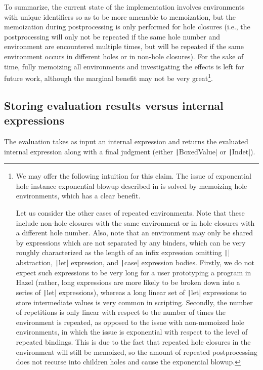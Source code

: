 To summarize, the current state of the implementation involves environments with unique identifiers so as to be more amenable to memoization, but the memoization during postprocessing is only performed for hole closures (i.e., the postprocessing will only not be repeated if the same hole number and environment are encountered multiple times, but will be repeated if the same environment occurs in different holes or in non-hole closures). For the sake of time, fully memoizing all environments and investigating the effects is left for future work, although the marginal benefit may not be very great\footnote{
  We may offer the following intuition for this claim. The issue of exponential hole instance exponential blowup described in  is solved by memoizing hole environments, which has a clear benefit.

  Let us consider the other cases of repeated environments. Note that these include non-hole closures with the same environment or in hole closures with a different hole number. Also, note that an environment may only be shared by expressions which are not separated by any binders, which can be very roughly characterized as the length of an infix expression omitting \texttt|\lambda| abstraction, \texttt|let| expression, and \texttt|case| expression bodies. Firstly, we do not expect such expressions to be very long for a user prototyping a program in Hazel (rather, long expressions are more likely to be broken down into a series of \texttt|let| expressions), whereas a long linear set of \texttt|let| expressions to store intermediate values is very common in scripting. Secondly, the number of repetitions is only linear with respect to the number of times the environment is repeated, as opposed to the issue with non-memoized hole environments, in which the issue is exponential with respect to the level of repeated bindings. This is due to the fact that repeated hole closures in the environment will still be memoized, so the amount of repeated postprocessing does not recurse into children holes and cause the exponential blowup.
}.

\subsection{Storing evaluation results versus internal expressions}
\label{sec:result-vs-dhexp}

The evaluation takes as input an internal expression and returns the evaluated internal expression along with a \textsf{final} judgment (either \texttt|BoxedValue| or \texttt|Indet|).

